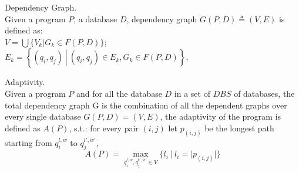 \documentclass[a4paper,11pt]{article}
\begin{document}
\begin{defn}
Dependency Graph.
\\
Given a program $P$, a database $D$, 
dependency graph $G(P, D) \triangleq (V, E)$ is defined as: 
\\
$V =\bigcup \{V_k | G_k \in F(P, D)  \}$;
\\
$E_k = \left\{(q_i,q_j) 
~ \left \vert ~ (q_i,q_j) \in E_k , G_k \in F(P, D) \right.\right\}$,
\end{defn}
%
%
\begin{defn}
Adaptivity.
\\
Given a program $P$ and for all the database $D$ in a set of $DBS$ of databases, the total dependency graph G is the combination of all the dependent graphs over every single database $G(P, D) = (V, E)$, the adaptivity of the program is defined as $A(P)$, s.t.:
for every pair $(i,j)$ let $p_{(i,j)}$ be the longest path starting from $q_i^{l, w}$ to $q_j^{l',w'}$,
%
$$A(P) = \max\limits_{q_i^{l,w},q_j^{l',w'} \in V }\{l_i ~|~ l_i = |p_(i,j)| \}$$
\end{defn}
%
%
\end{document}
